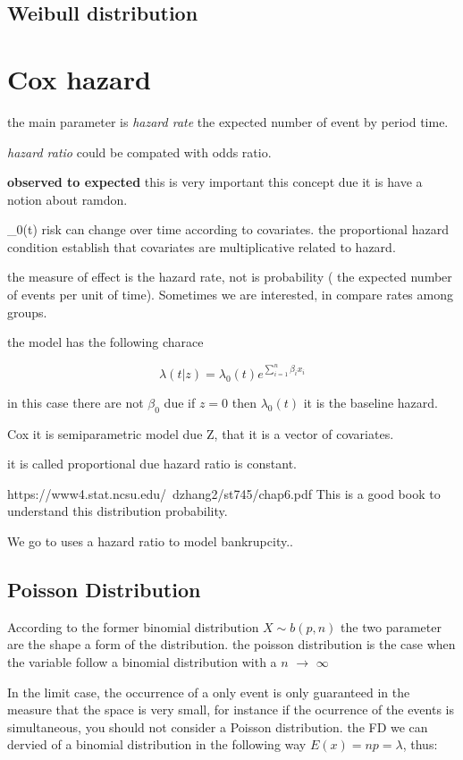 \documentclass[10pt,a4paper]{article}
\begin{document}
\subsection{Weibull distribution}

\section{Cox hazard}
the main parameter is \textit{hazard rate}
the expected number of event by period time.

\textit{hazard ratio} could be compated with odds ratio.

\textbf{observed to expected} this is very important this concept due 
it is have a notion about ramdon.

\lambd_{0}(t)  risk can change over time according to covariates.
the proportional hazard condition establish that covariates are multiplicative related to 
hazard. 

the measure of effect is the hazard rate, not is probability ( the expected number of events per unit of time). 
Sometimes we are interested, in compare rates among groups. 

the model has the following charace

$$\lambda(t|z)= \lambda_{0}(t) e^{\sum_{i=1}^{n} \beta_{i} x_{i}}$$

in this case there are not $\beta_{0}$ due if $z=0$ then $\lambda_{0}(t)$ it is the baseline hazard.

Cox it is semiparametric model due Z, that it is a vector of covariates.

it is called proportional due
hazard ratio is constant.

https://www4.stat.ncsu.edu/~dzhang2/st745/chap6.pdf  This is a good book to understand this distribution
probability.

We go to uses a hazard ratio to model bankrupcity.. 


\subsection{Poisson Distribution}

According to the former binomial distribution $ X \sim b(p,n)$  the  two parameter are the shape a form of the distribution.
the poisson distribution is the case when the variable follow a binomial distribution with a 
$n $ $\to$  $\infty $

In the limit case, the occurrence of  a only event is only guaranteed in the measure that the space is very small, for instance if the ocurrence of the events is simultaneous, you should not consider a Poisson distribution. the  FD we can dervied of a  binomial distribution in the following way $E(x)= np = \lambda$, thus:
\end{document}
